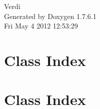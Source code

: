 \documentclass[a4paper]{book}
\begin{document}
\hypersetup{pageanchor=false,citecolor=blue}
\begin{titlepage}
\vspace*{7cm}
\begin{center}
{\Large \-Verdi }\\
\vspace*{1cm}
{\large \-Generated by Doxygen 1.7.6.1}\\
\vspace*{0.5cm}
{\small Fri May 4 2012 12:53:29}\\
\end{center}
\end{titlepage}
\clearemptydoublepage
{}
\tableofcontents
\clearemptydoublepage
{}
\hypersetup{pageanchor=true,citecolor=blue}
\chapter{\-Class \-Index}

\chapter{\-Class \-Index}

\end{document}
